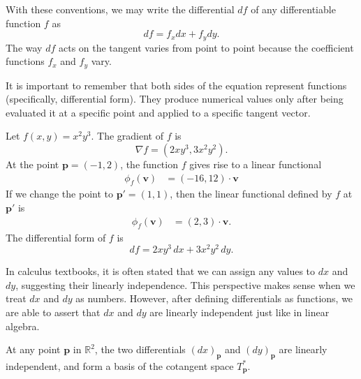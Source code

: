 With these conventions, we may write the differential $df$ of any differentiable function $f$ as 
\begin{equation}
df = f_x dx + f_y dy.
\label{ex:differential_partial_derivative}
\end{equation}
The way $df$ acts on the tangent varies from point to point because the coefficient functions $f_x$ and $f_y$ vary.

It is important to remember that both sides of the equation represent functions (specifically, differential form). They produce numerical values only  after being evaluated it at a specific point and applied to a specific tangent vector.




\begin{example} \label{ex:differential_form}
	Let $f(x,y) = x^2y^3$. The gradient of $f$ is 
	$$
	\nabla f = (2x y^3, 3x^2y^2).
	$$
At the point $\mathbf{p}=(-1,2)$, the function $f$ gives rise to a linear functional
	\begin{align*}
		\phi_f(\mathbf{v})
		&=  (-16 , 12) \cdot \mathbf{v}
	\end{align*}
	If we change the point to $\mathbf{p}'=(1,1)$, then the linear functional defined by $f$ at $\mathbf{p}'$ is
	\begin{align*}
		\phi_f(\mathbf{v})
		&=  (2, 3) \cdot \mathbf{v}.
	\end{align*} 
	The differential form of $f$ is
	$$
	df = 2xy^3 \, dx + 3x^2y^2 \, dy.
	$$
\end{example}



In calculus textbooks,  it is often stated that we can assign any values to $dx$ and $dy$, suggesting their linearly independence. This perspective makes sense when we treat $dx$ and $dy$ as numbers. However, after defining differentials as functions, we are able to assert that $dx$ and $dy$ are linearly independent just like in linear algebra. 

\begin{svgraybox}
	\begin{theorem} At any point $\mathbf{p}$ in $\mathbb{R}^2$,
	the two differentials $(dx)_\mathbf{p}$ and $(dy)_\mathbf{p}$ are linearly independent, and form a basis of the cotangent space $T_\mathbf{p}^*$. \label{thm:dx_dy_independent}
	\end{theorem}
\end{svgraybox}

